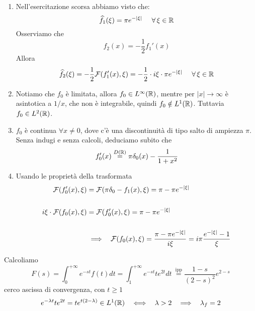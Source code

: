 \begin{enumerate}
\item Nell'esercitazione scorsa abbiamo visto che:
\begin{equation*}
\hat{f}_{1}(\xi) = \pi e^{ - | \xi | } \ \ \ \ \forall \xi \in \RR 
\end{equation*}Osserviamo che
\begin{equation*}
f_{2}(x) = - \frac{1}{2} f_{1} '(x)
\end{equation*}Allora
\begin{equation*}
\hat{f}_{2}(\xi) = - \frac{1}{2}\Fc (f_{1} '(x) ,\xi) = - \frac{1}{2} \cdot i\xi \cdot \pi e^{ - | \xi | } \ \ \ \ \forall \xi \in \RR 
\end{equation*}
\item Notiamo che $f_{0}$ è limitata, allora $f_{0} \in L^{\infty }(\mathbb{R})$, mentre per $| x| \rightarrow \infty $ è asintotica a $1/x$, che non è integrabile, quindi $f_{0} \notin L^{1}(\mathbb{R})$. Tuttavia $f_{0} \in L^{2}(\mathbb{R})$.
\item $f_{0}$ è continua $\forall x\neq 0$, dove c'è una discontinuità di tipo salto di ampiezza $\pi $. Senza indugi e senza calcoli, deduciamo subito che
\begin{equation*}
f_{0} '(x)\overset{D(\mathbb{R})}{ = } \pi \delta _{0}(x) - \frac{1}{1 + x^{2}}
\end{equation*}
\item Usando le proprietà della trasformata
\begin{align*}
\mathcal{F} (f_{0} '(x) ,\xi) & = \mathcal{F} (\pi \delta _{0} - f_{1}(x) ,\xi) = \pi - \pi e^{ - | \xi | }\\
 & \\
i\xi \cdot\mathcal{F} (f_{0}(x) ,\xi) & = \mathcal{F} (f_{0} '(x) ,\xi) = \pi - \pi e^{ - | \xi | }\\
 & \\
 & \implies \ \ \mathcal{F} (f_{0}(x) ,\xi) = \frac{\pi - \pi e^{ - | \xi | }}{i\xi } = i\pi \frac{e^{ - | \xi | } - 1}{\xi }
\end{align*}
\end{enumerate}
\Soluzione

Calcoliamo
\begin{equation*}
F(s) = \int ^{ + \infty }_{0} e^{ - st} f(t) dt = \int ^{ + \infty }_{1} e^{ - st} te^{2t} dt\ \overset{\text{ipp}}{ = }\frac{1 - s}{(2 - s)^{2}} e^{2 - s}
\end{equation*}
cerco ascissa di convergenza, con $t\geq 1$
\begin{equation*}
e^{ - \lambda t} te^{2t} = te^{t(2 - \lambda)} \in L^{1}(\RR) \ \ \iff \ \ \lambda  > 2\ \ \implies \ \ \lambda _{f} = 2
\end{equation*}
\Soluzione

